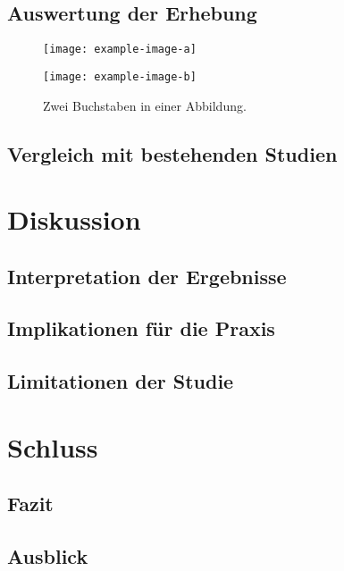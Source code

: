 \documentclass[twoside=false,DIV=8]{scrbook}
\begin{document}
\section{Auswertung der Erhebung}

\lipsum[1-3]

\begin{figure}[t]
  \begin{minipage}{\linewidth}
    \begin{minipage}{0.5\linewidth}
      \centering
      \texttt{[image: example-image-a]}
    \end{minipage}%
    \begin{minipage}{0.5\linewidth}
      \centering
      \texttt{[image: example-image-b]}
    \end{minipage}
    \caption{Zwei Buchstaben in einer Abbildung.}
  \end{minipage}
\end{figure}

\section{Vergleich mit bestehenden Studien}

\lipsum[4-8]

\chapter{Diskussion}

\section{Interpretation der Ergebnisse}

\lipsum[1]

\section{Implikationen für die Praxis}

\lipsum[2]

\section{Limitationen der Studie}

\lipsum[3]

\chapter{Schluss}

\section{Fazit}

\lipsum[1]

\section{Ausblick}

\lipsum[2]

\printbibliography
\end{document}
